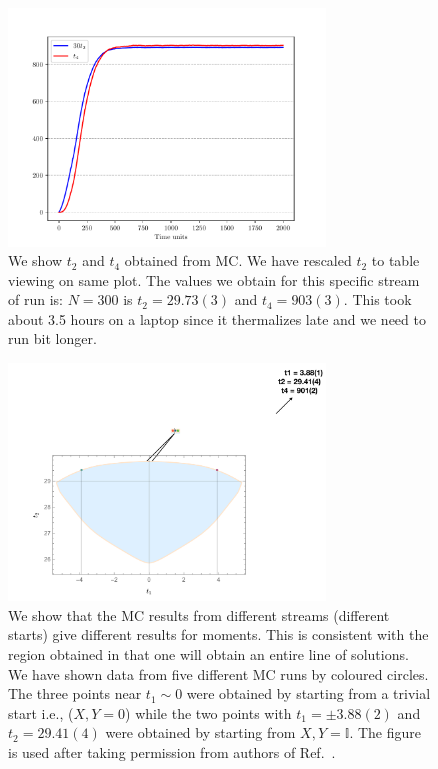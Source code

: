 \documentclass[11pt]{article}
\begin{document}
\begin{figure}[htbp] 
	\centering 
	\includegraphics[width=0.75\textwidth]{figs/2MM_symb_t2_t4.pdf}
	\caption{\label{fig:2MM_t2t4}We show $t_{2}$ and $t_{4}$ obtained from MC. We have rescaled $t_{2}$ to
	table viewing on same plot. The values we obtain for this specific stream of run is: $N=300$ is $t_{2} = 29.73(3)$ and $t_{4} = 903(3)$. This took about 3.5 hours on a laptop since it thermalizes late and we need to run bit longer.}
\end{figure}

\begin{figure}[h] 
	\centering 
	\includegraphics[width=0.75\textwidth]{figs/2MM_symb_ms.pdf}
	\caption{\label{fig:2MM_comp1}We show that the MC results from different streams (different starts) give different results for moments. This is consistent with the region obtained in \cite{Kazakov:2021lel} that one will obtain an entire line of solutions. We have shown data from five different MC runs by coloured circles. The three points near $t_{1} \sim 0$ were obtained by starting from a trivial start i.e., ($X,Y = 0$) while the two points with $t_{1} = \pm 3.88(2)$ and $t_{2}=29.41(4)$ were obtained by starting from $X,Y = \mathbb{I}$. 
The figure is used after taking permission from authors of Ref.~\cite{Kazakov:2021lel}.}
\end{figure}
\end{document}
